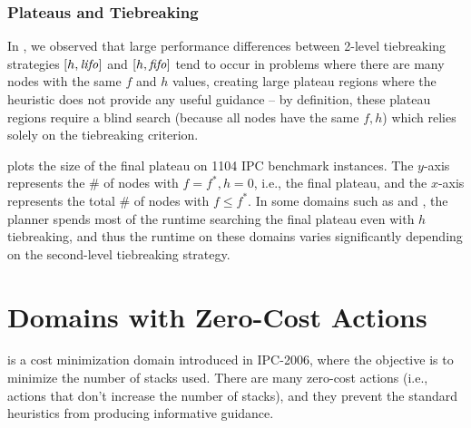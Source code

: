 

\subsubsection{Plateaus and Tiebreaking}

In ,
we observed that large performance differences between
2-level tiebreaking strategies $[h,{\mbox{\textit{lifo}}}]$ and $[h,{\mbox{\textit{fifo}}}]$ tend
to occur in problems where there are many nodes with the same $f$ and
$h$ values, creating large plateau regions where the heuristic does not
provide any useful guidance -- by definition, these plateau regions 
require a blind search (because all nodes
have the same $f,h$) which relies solely on the tiebreaking criterion.

 plots the size of the final plateau on 1104 IPC
benchmark instances.
The $y$-axis
represents the \# of nodes with $f=f^*, h=0$, i.e., the final plateau, and the $x$-axis represents the total
\# of nodes with $f\leq f^*$.
In some domains such as  and , the planner spends most of the runtime
searching the final plateau even with $h$ tiebreaking, and
thus the runtime on these domains varies significantly depending on the second-level tiebreaking strategy.

\section{Domains with Zero-Cost Actions}
\label{sec:zerocost-domains}
  is a cost
minimization domain introduced in IPC-2006, where the objective is to 
minimize the number of stacks used.
There are many zero-cost actions (i.e., actions that don't increase the number of stacks), and
they prevent the standard heuristics from producing
informative guidance.



